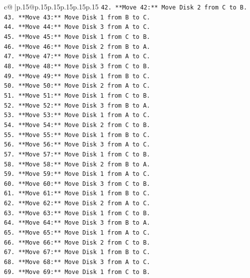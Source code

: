 \documentclass{article}
\begin{document}
{\begin{supertabular}{c@{$\;$}|p{.15\linewidth}@{}p{.15\linewidth}p{.15\linewidth}p{.15\linewidth}p{.15\linewidth}p{.15\linewidth}}
{{{\texttt{42. **Move 42:** Move Disk 2 from C to B.} \\
\texttt{43. **Move 43:** Move Disk 1 from B to C.} \\
\texttt{44. **Move 44:** Move Disk 3 from A to C.} \\
\texttt{45. **Move 45:** Move Disk 1 from C to B.} \\
\texttt{46. **Move 46:** Move Disk 2 from B to A.} \\
\texttt{47. **Move 47:** Move Disk 1 from A to C.} \\
\texttt{48. **Move 48:** Move Disk 3 from C to B.} \\
\texttt{49. **Move 49:** Move Disk 1 from B to C.} \\
\texttt{50. **Move 50:** Move Disk 2 from A to C.} \\
\texttt{51. **Move 51:** Move Disk 1 from C to B.} \\
\texttt{52. **Move 52:** Move Disk 3 from B to A.} \\
\texttt{53. **Move 53:** Move Disk 1 from A to C.} \\
\texttt{54. **Move 54:** Move Disk 2 from C to B.} \\
\texttt{55. **Move 55:** Move Disk 1 from B to C.} \\
\texttt{56. **Move 56:** Move Disk 3 from A to C.} \\
\texttt{57. **Move 57:** Move Disk 1 from C to B.} \\
\texttt{58. **Move 58:** Move Disk 2 from B to A.} \\
\texttt{59. **Move 59:** Move Disk 1 from A to C.} \\
\texttt{60. **Move 60:** Move Disk 3 from C to B.} \\
\texttt{61. **Move 61:** Move Disk 1 from B to C.} \\
\texttt{62. **Move 62:** Move Disk 2 from A to C.} \\
\texttt{63. **Move 63:** Move Disk 1 from C to B.} \\
\texttt{64. **Move 64:** Move Disk 3 from B to A.} \\
\texttt{65. **Move 65:** Move Disk 1 from A to C.} \\
\texttt{66. **Move 66:** Move Disk 2 from C to B.} \\
\texttt{67. **Move 67:** Move Disk 1 from B to C.} \\
\texttt{68. **Move 68:** Move Disk 3 from A to C.} \\
\texttt{69. **Move 69:** Move Disk 1 from C to B.} \\
}}}
\end{supertabular}}
\end{document}

